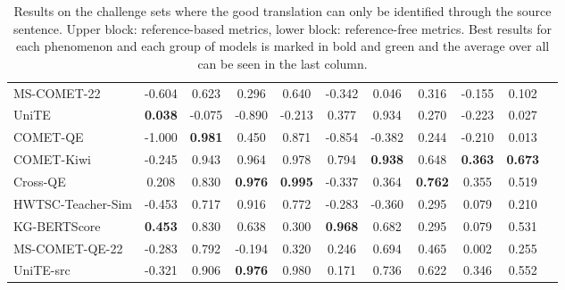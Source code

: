 \documentclass[11pt]{article}
\begin{document}
\begin{table*}[ht]
{\begin{tabular}{lcccccccccc}
   MS-COMET-22 & -0.604 & \phantom{-}0.623 & \phantom{-}0.296 & \phantom{-}0.640 & -0.342 & \phantom{-}0.046 & \phantom{-}0.316 & -0.155 & \phantom{-}0.102\\
   UniTE & \colorbox[HTML]{B2EAB1}{\textbf{\phantom{-}0.038}} & -0.075 & -0.890 & -0.213 & \phantom{-}0.377 & \phantom{-}0.934 & \phantom{-}0.270 & -0.223 & \phantom{-}0.027\\
   \midrule
    COMET-QE & -1.000 & \colorbox[HTML]{B2EAB1}{\textbf{\phantom{-}0.981}} & \phantom{-}0.450 & \phantom{-}0.871 & -0.854 & -0.382 & \phantom{-}0.244 & -0.210 & \phantom{-}0.013 \\
   COMET-Kiwi & -0.245 & \phantom{-}0.943 & \phantom{-}0.964 & \phantom{-}0.978 & \phantom{-}0.794 & \colorbox[HTML]{B2EAB1}{\textbf{\phantom{-}0.938}} & \phantom{-}0.648 & \colorbox[HTML]{B2EAB1}{\textbf{\phantom{-}0.363}} & \colorbox[HTML]{B2EAB1}{\textbf{\phantom{-}0.673}} \\
   Cross-QE & \phantom{-}0.208 & \phantom{-}0.830 & \colorbox[HTML]{B2EAB1}{\textbf{\phantom{-}0.976}} & \colorbox[HTML]{B2EAB1}{\textbf{\phantom{-}0.995}} & -0.337 & \phantom{-}0.364 & \colorbox[HTML]{B2EAB1}{\textbf{\phantom{-}0.762}} & \phantom{-}0.355 & \phantom{-}0.519 \\
    HWTSC-Teacher-Sim & -0.453 & \phantom{-}0.717 & \phantom{-}0.916 & \phantom{-}0.772 & -0.283 & -0.360 & \phantom{-}0.295 & \phantom{-}0.079 & \phantom{-}0.210 \\
    KG-BERTScore & \colorbox[HTML]{B2EAB1}{\textbf{\phantom{-}0.453}} & \phantom{-}0.830 & \phantom{-}0.638 & \phantom{-}0.300 & \colorbox[HTML]{B2EAB1}{\textbf{\phantom{-}0.968}} & \phantom{-}0.682 & \phantom{-}0.295 & \phantom{-}0.079 & \phantom{-}0.531 \\
    MS-COMET-QE-22 & -0.283 & \phantom{-}0.792 & -0.194 & \phantom{-}0.320 & \phantom{-}0.246 & \phantom{-}0.694 & \phantom{-}0.465 & \phantom{-}0.002 & \phantom{-}0.255 \\
    UniTE-src & -0.321 & \phantom{-}0.906 & \colorbox[HTML]{B2EAB1}{\textbf{\phantom{-}0.976}} & \phantom{-}0.980 & \phantom{-}0.171 & \phantom{-}0.736 & \phantom{-}0.622 & \phantom{-}0.346 & \phantom{-}0.552 \\
   \bottomrule
    \end{tabular}}
    \caption{Results on the challenge sets where the good translation can only be identified through the source sentence. Upper block: reference-based metrics, lower block: reference-free metrics. Best results for each phenomenon and each group of models is marked in bold and green and the average over all can be seen in the last column.}
    \label{tab:src_disambig}
\end{table*} 
\end{document}
